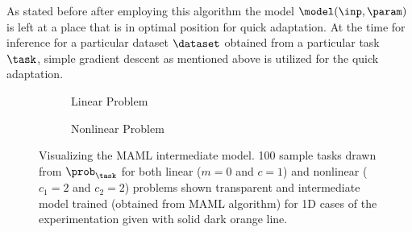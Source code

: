 As stated before after employing this algorithm the model $\model(\inp, \param)$ is left at a place that is in optimal position for quick adaptation. At the time for inference for a particular dataset $\dataset$ obtained from a particular task $\task$, simple gradient descent as mentioned above is utilized for the quick adaptation.

\begin{figure}[ht!]
  \centering
  \begin{subfigure}[b]{0.49\textwidth}
    \centering
    \caption{Linear Problem}
    \label{fig:lin_maml}
  \end{subfigure}
  \begin{subfigure}[b]{0.49\textwidth}
    \centering
    \caption{Nonlinear Problem}
    \label{fig:nonlin_maml}
  \end{subfigure}
  \caption{Visualizing the MAML intermediate model. 100 sample tasks drawn from $\prob_\task$ for both linear ($m=0$ and $c=1$) and nonlinear ($c_1=2$ and $c_2=2$) problems shown transparent and intermediate model trained (obtained from MAML algorithm) for 1D cases of the experimentation given with solid dark orange line.}
\end{figure}


